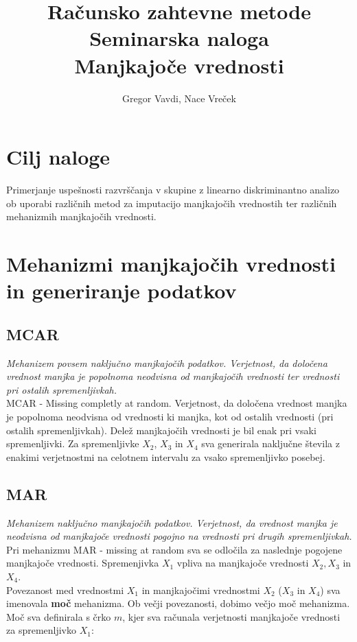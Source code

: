 \documentclass[12pt,a4paper]{article}
\author{Gregor Vavdi, Nace Vreček}
\title{Računsko zahtevne metode \\
\large{Seminarska naloga\\
Manjkajoče vrednosti}}
\begin{document}
	\maketitle
	\pagebreak
	\tableofcontents



\section{Cilj naloge}
Primerjanje uspešnosti razvrščanja v skupine z linearno diskriminantno analizo ob uporabi različnih metod za imputacijo manjkajočih vrednostih ter različnih mehanizmih manjkajočih vrednosti.

\pagebreak

\section{Mehanizmi manjkajočih vrednosti in generiranje podatkov}

\subsection{MCAR}
\textit{Mehanizem povsem naključno manjkajočih podatkov. Verjetnost, da določena vrednost manjka je popolnoma neodvisna od manjkajočih vrednosti ter vrednosti pri ostalih spremenljivkah.}
\\

\noindent MCAR - Missing completly at random. Verjetnost, da določena vrednost manjka je popolnoma neodvisna od vrednosti ki manjka, kot od ostalih vrednosti (pri ostalih spremenljivkah). Delež manjkajočih vrednosti je bil enak pri vsaki spremenljivki. Za spremenljivke $X_2$, $X_3$ in $X_4$ sva generirala naključne števila z enakimi verjetnostmi na celotnem intervalu za vsako spremenljivko posebej.



\subsection{MAR}
\textit{Mehanizem naključno manjkajočih podatkov. Verjetnost, da vrednost manjka je neodvisna od manjkajoče vrednosti pogojno na vrednosti pri drugih spremenljivkah.}
\\

\noindent Pri mehanizmu MAR - missing at random sva se odločila za naslednje pogojene manjkajoče vrednosti. Spremenjivka $X_1$ vpliva na manjkajoče vrednosti $X_2, X_3$ in $X_4$.
\\
\noindent Povezanost med vrednostmi $X_1$ in manjkajočimi vrednostmi $X_2$ ($X_3$ in $X_4$) sva imenovala \textbf{moč} mehanizma. Ob večji povezanosti, dobimo večjo moč mehanizma. Moč sva definirala s črko $m$, kjer sva računala verjetnosti manjkajoče vrednosti za spremenljivko $X_1$:
\end{document}
